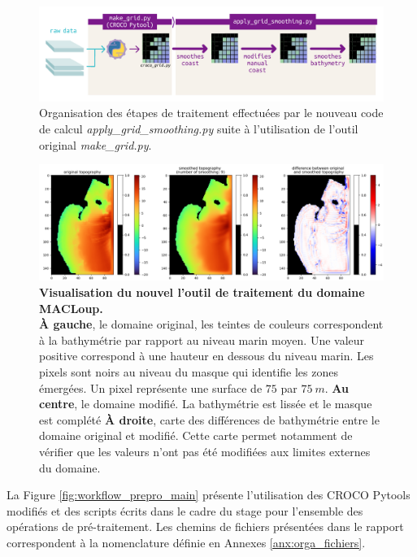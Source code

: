 \documentclass[10pt,a4paper,titlepage]{article}
\begin{document}
    \begin{figure}[h!]
        \centering
        \includegraphics[scale=0.7]{../images/workflow/grid_smoothing.pdf}
        \caption{Organisation des étapes de traitement effectuées par le nouveau code de calcul \textit{apply\_grid\_smoothing.py} suite à l'utilisation de l'outil original \textit{make\_grid.py}.}
        \label{fig:new_smooth_work}
        
    \end{figure}
    \begin{figure}[h!]
        \centering
        \includegraphics[scale=0.35]{../images/grid_smoothing_adcl5_9.png}
        \caption{
            \textbf{Visualisation du nouvel l'outil de traitement du domaine MACLoup.}\\
            \textbf{À gauche}, le domaine original, les teintes de couleurs correspondent à la bathymétrie par rapport au niveau marin moyen.
            Une valeur positive correspond à une hauteur en dessous du niveau marin.
            Les pixels sont noirs au niveau du masque qui identifie les zones émergées.
            Un pixel représente une surface de $75$ par $75~m$.
            \textbf{Au centre}, le domaine modifié.
            La bathymétrie est lissée et le masque est complété
            \textbf{À droite}, carte des différences de bathymétrie entre le domaine original et modifié.
            Cette carte permet notamment de vérifier que les valeurs n'ont pas été modifiées aux limites externes du domaine.
        }
        \label{fig:new_smooth}
    \end{figure}
    
    La Figure \ref{fig:workflow_prepro_main} présente l'utilisation des CROCO Pytools modifiés et des scripts écrits dans le cadre du stage pour l'ensemble des opérations de pré-traitement.
    Les chemins de fichiers présentées dans le rapport correspondent à la nomenclature définie en Annexes \ref{anx:orga_fichiers}.
    
\end{document}
